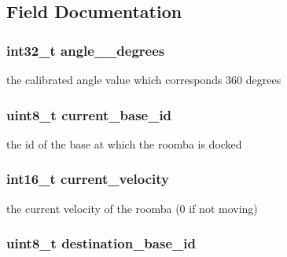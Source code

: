 \subsection{\-Field \-Documentation}
\hypertarget{structroomba__data_a938f80c21b9bcc3a8598135c5b141b75}{
\subsubsection[{angle\-\_\-360\-\_\-degrees}]{\setlength{\rightskip}{0pt plus 5cm}int32\-\_\-t {\bf angle\-\_\-\_\-degrees}}}\label{structroomba__data_a938f80c21b9bcc3a8598135c5b141b75}
the calibrated angle value which corresponds 360 degrees \hypertarget{structroomba__data_a29ec4a96bc0931db96257857fd300de5}{
\subsubsection[{current\-\_\-base\-\_\-id}]{\setlength{\rightskip}{0pt plus 5cm}uint8\-\_\-t {\bf current\-\_\-base\-\_\-id}}}\label{structroomba__data_a29ec4a96bc0931db96257857fd300de5}
the id of the base at which the roomba is docked \hypertarget{structroomba__data_a7f174749fed904af98a79cb40f2e9b2c}{
\subsubsection[{current\-\_\-velocity}]{\setlength{\rightskip}{0pt plus 5cm}int16\-\_\-t {\bf current\-\_\-velocity}}}\label{structroomba__data_a7f174749fed904af98a79cb40f2e9b2c}
the current velocity of the roomba (0 if not moving) \hypertarget{structroomba__data_acda989cdf9bced3a9a1598c2328b266b}{
\subsubsection[{destination\-\_\-base\-\_\-id}]{\setlength{\rightskip}{0pt plus 5cm}uint8\-\_\-t {\bf destination\-\_\-base\-\_\-id}}}\label{structroomba__data_acda989cdf9bced3a9a1598c2328b266b}
